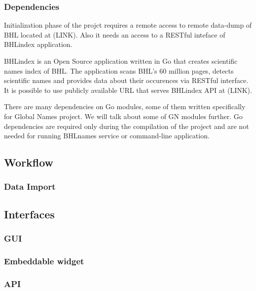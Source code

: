 \documentclass[
]{article}
\begin{document}
\hypertarget{dependencies}{%
\subsubsection{Dependencies}\label{dependencies}}

Initialization phase of the projct requires a remote access to remote
data-dump of BHL located at (LINK). Also it needs an access to a RESTful
inteface of BHLindex application.

BHLindex is an Open Source application written in Go that creates
scientific names index of BHL. The application scans BHL's 60 million
pages, detects scientific names and provides data about their occurences
via RESTful interface. It is possible to use publicly available URL that
serves BHLindex API at (LINK).

There are many dependencies on Go modules, some of them written
specifically for Global Names project. We will talk about some of GN
modules further. Go dependencies are required only during the
compilation of the project and are not needed for running BHLnames
service or command-line application.

\hypertarget{workflow}{%
\subsection{Workflow}\label{workflow}}

\hypertarget{data-import}{%
\subsubsection{Data Import}\label{data-import}}

\hypertarget{interfaces}{%
\subsection{Interfaces}\label{interfaces}}

\hypertarget{gui}{%
\subsubsection{GUI}\label{gui}}

\hypertarget{embeddable-widget}{%
\subsubsection{Embeddable widget}\label{embeddable-widget}}

\hypertarget{api}{%
\subsubsection{API}\label{api}}
\end{document}
